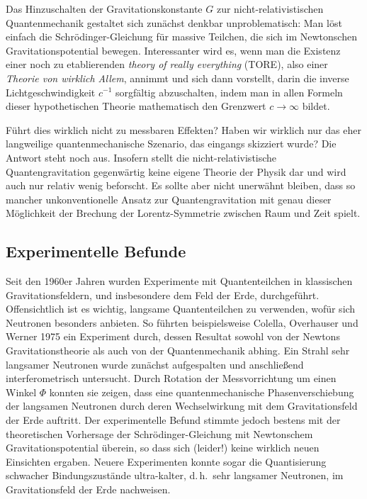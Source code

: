 
\newpage {}
\label{sec:1010}

Das Hinzuschalten der Gravitationskonstante $G$ zur nicht-relativistischen Quantenmechanik gestaltet sich zunächst denkbar unproblematisch: Man löst einfach die Schrödinger-Gleichung für massive Teilchen, die sich im Newtonschen Gravitationspotential bewegen. Interessanter wird es, wenn man die Existenz einer noch zu etablierenden \emph{theory of really everything} (TORE), also einer \emph{Theorie von wirklich Allem}, 
annimmt und sich dann vorstellt, darin die inverse Lichtgeschwindigkeit $c^{−1}$ sorgfältig abzuschalten, indem man in allen Formeln dieser hypothetischen Theorie mathematisch den Grenzwert $c\rightarrow\infty$ bildet.

Führt dies wirklich nicht zu messbaren Effekten? Haben wir wirklich nur das eher langweilige quantenmechanische Szenario, das eingangs skizziert wurde? Die Antwort steht noch aus. Insofern stellt die nicht-relativistische Quantengravitation gegenwärtig keine eigene Theorie der Physik dar und wird auch nur relativ wenig beforscht. Es sollte aber nicht unerwähnt bleiben, dass so mancher unkonventionelle Ansatz zur Quantengravitation mit genau dieser Möglichkeit der Brechung der Lorentz-Symmetrie zwischen Raum und Zeit spielt.


\subsection*{Experimentelle Befunde}

Seit den 1960er Jahren wurden Experimente mit Quantenteilchen in klassischen Gravitationsfeldern, und insbesondere dem Feld der Erde, durchgeführt. 
Offensichtlich ist es wichtig, langsame Quantenteilchen zu verwenden, wofür sich Neutronen besonders anbieten. So führten beispielsweise Colella, Overhauser und Werner 1975 ein Experiment durch, dessen Resultat sowohl von der Newtons Gravitationstheorie als auch von der Quantenmechanik abhing. Ein Strahl sehr langsamer Neutronen wurde zunächst aufgespalten und anschließend interferometrisch untersucht. Durch Rotation der Messvorrichtung um einen Winkel $\Phi$ konnten sie zeigen, dass eine quantenmechanische Phasenverschiebung der langsamen Neutronen durch deren Wechselwirkung mit dem Gravitationsfeld der Erde auftritt. Der experimentelle Befund stimmte jedoch bestens mit der theoretischen Vorhersage der Schrödinger-Gleichung mit Newtonschem Gravitationspotential überein, so dass sich (leider!) keine wirklich neuen Einsichten ergaben. Neuere Experimenten konnte sogar die Quantisierung schwacher Bindungszustände ultra-kalter, d.\,h.\ sehr langsamer Neutronen, im Gravitationsfeld der Erde nachweisen.


